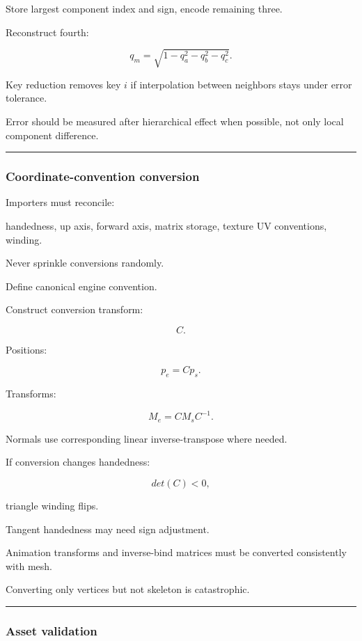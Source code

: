 Store largest component index and sign, encode remaining three.

Reconstruct fourth:

\[
q_m=
\sqrt{
1-
q_a^2-
q_b^2-
q_c^2
}.
\]

Key reduction removes key \(i\) if interpolation between neighbors stays under error tolerance.

Error should be measured after hierarchical effect when possible, not only local component difference.

\begin{center}\rule{0.5\linewidth}{0.5pt}\end{center}

\subsubsection{Coordinate-convention conversion}\label{coordinate-convention-conversion}

Importers must reconcile:

handedness, up axis, forward axis, matrix storage, texture UV conventions, winding.

Never sprinkle conversions randomly.

Define canonical engine convention.

Construct conversion transform:

\[
C.
\]

Positions:

\[
p_e=
Cp_s.
\]

Transforms:

\[
\boxed{
M_e=
CM_sC^{-1}.
}
\]

Normals use corresponding linear inverse-transpose where needed.

If conversion changes handedness:

\[
det(C)<0,
\]

triangle winding flips.

Tangent handedness may need sign adjustment.

Animation transforms and inverse-bind matrices must be converted consistently with mesh.

Converting only vertices but not skeleton is catastrophic.

\begin{center}\rule{0.5\linewidth}{0.5pt}\end{center}

\subsubsection{Asset validation}\label{asset-validation}

